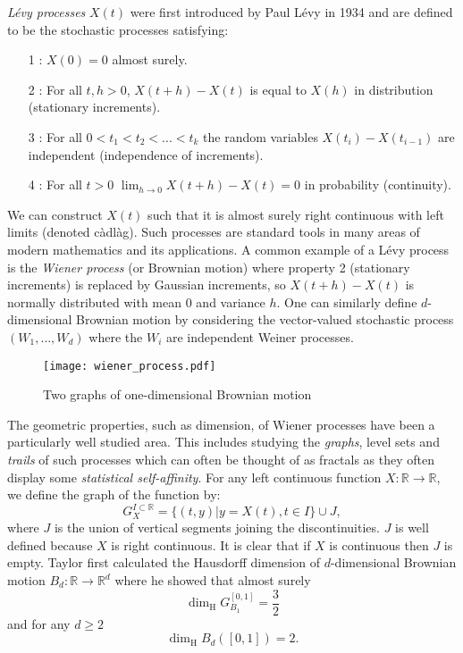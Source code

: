 \documentclass{amsart}
\begin{document}
\emph{L\'{e}vy processes} $X(t)$ were first introduced by Paul L\'evy in 1934 \cite{Le} and are defined to be the stochastic processes satisfying:
\begin{itemize}
	\item[1]: $X(0)=0$ almost surely.
	\item[2]: For all $t,h>0$, $X(t+h)-X(t)$ is equal to $X(h)$ in distribution (stationary increments).
	\item[3]: For all $0<t_1<t_2<...<t_k$ the random variables $X(t_i)-X(t_{i-1})$ are independent (independence of increments).
	\item[4]: For all $t>0$ $\lim_{h\to 0} X(t+h)-X(t)=0$ in probability (continuity).
\end{itemize}
We can construct $X(t)$ such that it is almost surely right continuous with left limits (denoted c\`adl\`ag). Such processes are standard tools in many areas of modern mathematics and its applications. A common example of a L\'evy process is the \emph{Wiener process} (or Brownian motion) where property 2 (stationary increments) is replaced by Gaussian increments, so $X(t+h)-X(t)$ is normally distributed with mean 0 and variance $h$. One can similarly define $d$-dimensional Brownian motion by considering the vector-valued stochastic process $(W_1,\ldots, W_d)$ where the $W_i$ are independent Weiner processes. 

\begin{figure}[h]
\texttt{[image: wiener\_process.pdf]}
\caption{\label{fig:brownianmotion}Two graphs of one-dimensional Brownian motion}
\end{figure}

The geometric properties, such as dimension, of Wiener processes have been a particularly well studied area. This includes studying the \emph{graphs}, level sets and \emph{trails} of such processes which can often be thought of as fractals as they often display some \emph{statistical self-affinity}. For any left continuous function $X:\mathbb{R}\to\mathbb{R}$, we define the graph of the function by:
\[
G^{I\subset\mathbb{R}}_{X}=\{(t,y)|y=X(t),t\in I\}\cup J,
\]
where $J$ is the union of vertical segments joining the discontinuities. $J$ is well defined because $X$ is right continuous. It is clear that if $X$ is continuous then $J$ is empty. Taylor \cite{Ta} first calculated the Hausdorff dimension of $d$-dimensional Brownian motion $B_d:\mathbb{R}\to\mathbb{R}^d$ where he showed that almost surely
\[
\dim_\text{H} G_{B_1}^{[0,1]} =  \frac{3}{2}         
\]
and for any $d\ge 2$
\[
\dim_\text{H} B_d([0,1]) =  2.
\]
\end{document}
